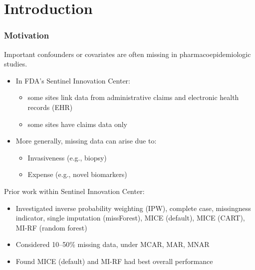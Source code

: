\documentclass[10pt, table]{beamer}
\begin{document}
\section{Introduction}
\begin{frame} \frametitle{Motivation}
  Important confounders or covariates are often missing in pharmacoepidemiologic studies. \vspace{-.4cm}
  \begin{itemize}
    \item In FDA's Sentinel Innovation Center:
      \begin{itemize}
        \item some sites link data from administrative claims and electronic health records (EHR)
        \item some sites have claims data only
      \end{itemize}
    \item More generally, missing data can arise due to:
      \begin{itemize}
        \item Invasiveness (e.g., biopsy) 
        \item Expense (e.g., novel biomarkers)
      \end{itemize}
  \end{itemize} \pause
  
  Prior work within Sentinel Innovation Center:  \vspace{-.4cm}
  \begin{itemize}
    \item Investigated inverse probability weighting (IPW), complete case, missingness indicator, single imputation (missForest), MICE (default), MICE (CART), MI-RF (random forest)
    \item Considered 10--50\% missing data, under MCAR, MAR, MNAR
    \item Found MICE (default) and MI-RF had best overall performance
  \end{itemize}
\end{frame}
\end{document}
